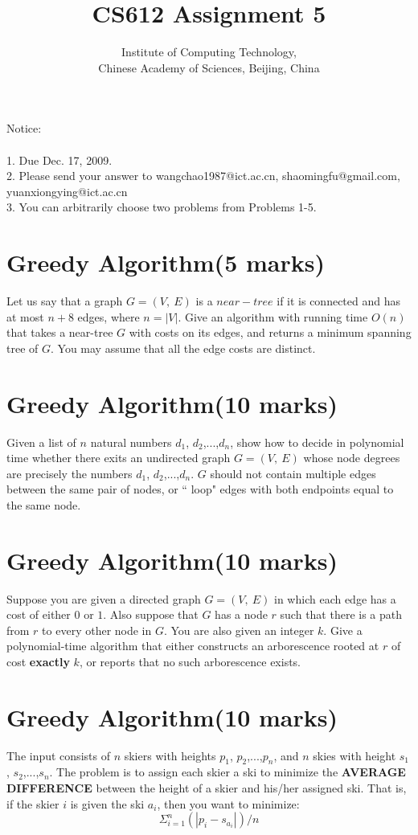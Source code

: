 \documentclass[a4paper,11pt]{article}
\title{CS612 Assignment 5}
\author{Institute of Computing Technology, \\
                       Chinese Academy of Sciences, Beijing, China }
\begin{document}
\maketitle

Notice:\\\\
1. Due Dec. 17, 2009.\\
2. Please send your answer to wangchao1987@ict.ac.cn, shaomingfu@gmail.com, yuanxiongying@ict.ac.cn\\
3. You can arbitrarily choose two problems from Problems 1-5.
\section{Greedy Algorithm(5 marks)}
Let us say that a graph $G=(V,\ E)$ is a $near-tree$ if it is connected and has at most $n+8$ edges, where $n=|V|$. Give an algorithm with running time $O(n)$ that takes a near-tree $G$ with costs on its edges, and returns a minimum spanning tree of $G$. You may assume that all the edge costs are distinct.

\section{Greedy Algorithm(10 marks)}
Given a list of $n$ natural numbers $d_1$, $d_2$,...,$d_n$, show how to decide in polynomial time whether there exits an undirected graph $G=(V,\ E)$ whose node degrees are precisely the numbers $d_1$, $d_2$,...,$d_n$. $G$ should not contain multiple edges between the same pair of nodes, or `` loop" edges with both endpoints equal to the same node.

\section{Greedy Algorithm(10 marks)}
Suppose you are given a directed graph $G=(V,\ E)$ in which each edge has a cost of either $0$ or $1$. Also suppose that $G$ has a node $r$ such that there is a path from $r$ to every other node in $G$. You are also given an integer $k$. Give a polynomial-time algorithm that either constructs an arborescence rooted at $r$ of cost {\bf exactly} $k$, or reports that no such arborescence exists.

\section{Greedy Algorithm(10 marks)}
The input consists of $n$ skiers with heights $p_1$, $p_2$,...,$p_n$, and $n$ skies with height $s_1$, $s_2$,...,$s_n$. The problem is to assign each skier a ski to minimize the {\bf AVERAGE DIFFERENCE} between the height of a skier and his/her assigned ski. That is, if the skier $i$ is given the ski $a_i$, then you want to minimize:$${\Sigma}_{i=1}^n (|p_i-s_{a_i}|)/n$$
\end{document}

